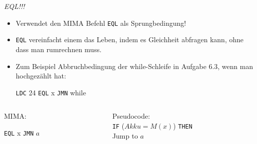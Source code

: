 {\begin{frame}{}
	\emph{EQL!!!}
	\begin{itemize}
		\item Verwendet den MIMA Befehl \texttt{EQL} als Sprungbedingung!
		\item \texttt{EQL} vereinfacht einem das Leben, indem es Gleichheit abfragen kann, ohne dass man rumrechnen muss.
		\item Zum Beispiel Abbruchbedingung der while-Schleife in Aufgabe 6.3, wenn man hochgezählt hat: \begin{algorithmic}[1]
			\State \texttt{LDC} 24
			\State \texttt{EQL} x 
			\State \texttt{JMN} while
		\end{algorithmic}
	\end{itemize}

	\bigskip

	\begin{columns}
		\begin{column}{0.475\textwidth}
			MIMA:
			\begin{center}
				\begin{algorithmic}[1]
					\State \texttt{EQL} x
					\State \texttt{JMN} $a$
				\end{algorithmic}
			\end{center}
		\end{column}
		
		\begin{column}{0.475\textwidth}
			Pseudocode: \\[1em]
				\texttt{IF} ($Akku = M(x)$) \texttt{THEN} \\
				\quad Jump to $a$
		\end{column}
	\end{columns}
\end{frame}

}